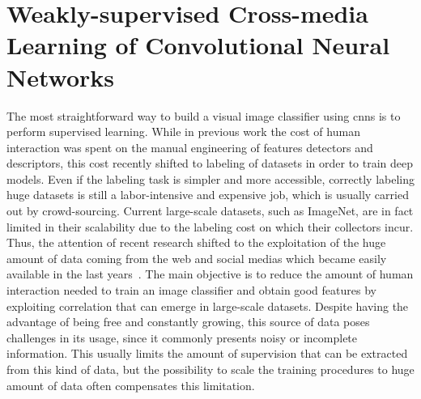 
\graphicspath{{img/vsa/}}

\newcommand{\BTSA}{B-T4SA}
\newcommand{\ourFtAlex}{Hybrid-T4SA}
\newcommand{\ourFtVGG}{VGG-T4SA}

\chapter{Weakly-supervised Cross-media Learning of Convolutional Neural Networks}
\label{ch:cross-media}

The most straightforward way to build a visual image classifier using \glspl{cnn} is to perform supervised learning.
While in previous work the cost of human interaction was spent on the manual engineering of features detectors and descriptors, this cost recently shifted to labeling of datasets in order to train deep models.
Even if the labeling task is simpler and more accessible, correctly labeling huge datasets is still a labor-intensive and expensive job, which is usually carried out by crowd-sourcing.
Current large-scale datasets, such as ImageNet, are in fact limited in their scalability due to the labeling cost on which their collectors incur.
Thus, the attention of recent research shifted to the exploitation of the huge amount of data coming from the web and social medias which became easily available in the last years~\cite{sun2017revisiting,mahajan2018exploring}.
The main objective is to reduce the amount of human interaction needed to train an image classifier and obtain good features by exploiting correlation that can emerge in large-scale datasets.
Despite having the advantage of being free and constantly growing, this source of data poses challenges in its usage, since it commonly presents noisy or incomplete information.
This usually limits the amount of supervision that can be extracted from this kind of data, but the possibility to scale the training procedures to huge amount of data often compensates this limitation.

